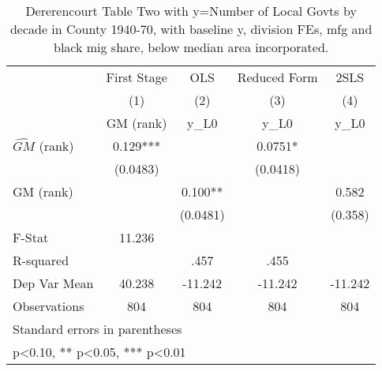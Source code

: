 \begin{table}[htbp]\centering
\def\sym#1{\ifmmode^{#1}\else\(^{#1}\)\fi}
\caption{Dererencourt Table Two with y=Number of Local Govts by decade in County 1940-70, with baseline y, division FEs, mfg and black mig share, below median area incorporated.}
\begin{tabular}{l*{4}{c}}
\toprule
                    & First Stage   &         OLS   &Reduced Form   &        2SLS   \\
                    &\multicolumn{1}{c}{(1)}&\multicolumn{1}{c}{(2)}&\multicolumn{1}{c}{(3)}&\multicolumn{1}{c}{(4)}\\
                    &\multicolumn{1}{c}{GM  (rank)}&\multicolumn{1}{c}{y\_L0}&\multicolumn{1}{c}{y\_L0}&\multicolumn{1}{c}{y\_L0}\\
\midrule
$\hat{GM}$ (rank)   &       0.129***&               &      0.0751*  &               \\
                    &    (0.0483)   &               &    (0.0418)   &               \\
\addlinespace
GM  (rank)          &               &       0.100** &               &       0.582   \\
                    &               &    (0.0481)   &               &     (0.358)   \\
\midrule
F-Stat              &      11.236   &               &               &               \\
R-squared           &               &        .457   &        .455   &               \\
Dep Var Mean        &      40.238   &     -11.242   &     -11.242   &     -11.242   \\
Observations        &         804   &         804   &         804   &         804   \\
\bottomrule
\multicolumn{5}{l}{\footnotesize Standard errors in parentheses}\\
\multicolumn{5}{l}{\footnotesize * p<0.10, ** p<0.05, *** p<0.01}\\
\end{tabular}
\end{table}
